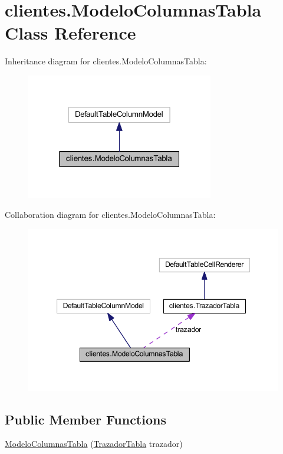 \hypertarget{classclientes_1_1_modelo_columnas_tabla}{}\section{clientes.\+Modelo\+Columnas\+Tabla Class Reference}
\label{classclientes_1_1_modelo_columnas_tabla}


Inheritance diagram for clientes.\+Modelo\+Columnas\+Tabla\+:\nopagebreak
\begin{figure}[H]
\begin{center}
\leavevmode
\includegraphics[width=232pt]{classclientes_1_1_modelo_columnas_tabla__inherit__graph}
\end{center}
\end{figure}


Collaboration diagram for clientes.\+Modelo\+Columnas\+Tabla\+:\nopagebreak
\begin{figure}[H]
\begin{center}
\leavevmode
\includegraphics[width=347pt]{classclientes_1_1_modelo_columnas_tabla__coll__graph}
\end{center}
\end{figure}
\subsection*{Public Member Functions}
\begin{DoxyCompactItemize}
\item 
\mbox{\hyperlink{classclientes_1_1_modelo_columnas_tabla_a459144165e8e786dea691bf1a3beeebb}{Modelo\+Columnas\+Tabla}} (\mbox{\hyperlink{classclientes_1_1_trazador_tabla}{Trazador\+Tabla}} trazador)
\end{DoxyCompactItemize}


